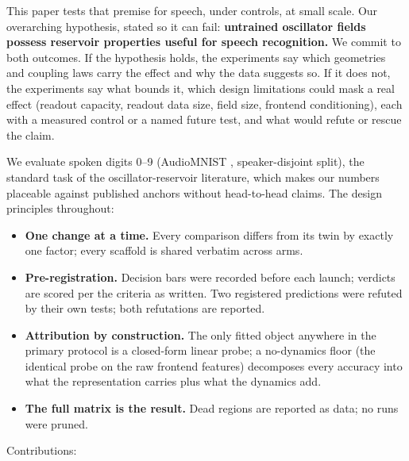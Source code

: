 \documentclass{article}
\providecommand{\tightlist}{%
  \setlength{\itemsep}{0pt}\setlength{\parskip}{0pt}}
\begin{document}
This paper tests that premise for speech, under controls, at small
scale. Our overarching hypothesis, stated so it can fail:
\textbf{untrained oscillator fields possess reservoir properties useful
for speech recognition.} We commit to both outcomes. If the hypothesis
holds, the experiments say which geometries and coupling laws carry the
effect and why the data suggests so. If it does not, the experiments say
what bounds it, which design limitations could mask a real effect
(readout capacity, readout data size, field size, frontend
conditioning), each with a measured control or a named future test, and
what would refute or rescue the claim.

We evaluate spoken digits 0--9 (AudioMNIST \citep{becker2024},
speaker-disjoint split), the standard task of the oscillator-reservoir
literature, which makes our numbers placeable against published anchors
without head-to-head claims. The design principles throughout:

\begin{itemize}
\tightlist
\item
  \textbf{One change at a time.} Every comparison differs from its twin
  by exactly one factor; every scaffold is shared verbatim across arms.
\item
  \textbf{Pre-registration.} Decision bars were recorded before each
  launch; verdicts are scored per the criteria as written. Two
  registered predictions were refuted by their own tests; both
  refutations are reported.
\item
  \textbf{Attribution by construction.} The only fitted object anywhere
  in the primary protocol is a closed-form linear probe; a no-dynamics
  floor (the identical probe on the raw frontend features) decomposes
  every accuracy into what the representation carries plus what the
  dynamics add.
\item
  \textbf{The full matrix is the result.} Dead regions are reported as
  data; no runs were pruned.
\end{itemize}

Contributions:
\end{document}
